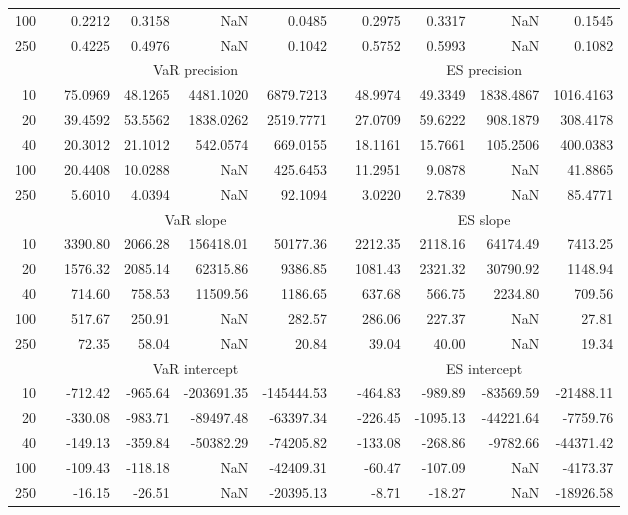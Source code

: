 {{\begin{longtable}{rr rrrr r rrrr}
100 && 0.2212  & 0.3158  &    NaN & 0.0485 && 0.2975  & 0.3317  &    NaN & 0.1545 \\ 
250 && 0.4225  & 0.4976  &    NaN & 0.1042 && 0.5752  & 0.5993  &    NaN & 0.1082 \\ 
\hline 
 & & \multicolumn{4}{c}{VaR precision} &&  \multicolumn{4}{c}{ES precision} \\ \cline{3-6}  \cline{8-11}
10 && 75.0969 & 48.1265 & 4481.1020 & 6879.7213 & & 48.9974 & 49.3349 & 1838.4867 & 1016.4163 \\ 
20 && 39.4592 & 53.5562 & 1838.0262 & 2519.7771 & & 27.0709 & 59.6222 & 908.1879 & 308.4178 \\ 
40 && 20.3012 & 21.1012 & 542.0574 & 669.0155 & & 18.1161 & 15.7661 & 105.2506 & 400.0383 \\ 
100 && 20.4408 & 10.0288 &    NaN & 425.6453 & & 11.2951 & 9.0878 &    NaN & 41.8865 \\ 
250 && 5.6010 & 4.0394 &    NaN & 92.1094 & & 3.0220 & 2.7839 &    NaN & 85.4771 \\ 
\hline 
 & & \multicolumn{4}{c}{ VaR slope} && \multicolumn{4}{c}{ES slope} \\ \cline{3-6}  \cline{8-11}
10 && 3390.80 & 2066.28 & 156418.01 & 50177.36 && 2212.35 & 2118.16 & 64174.49 & 7413.25 \\ 
20 && 1576.32 & 2085.14 & 62315.86 & 9386.85 && 1081.43 & 2321.32 & 30790.92 & 1148.94 \\ 
40 && 714.60 & 758.53 & 11509.56 & 1186.65 && 637.68 & 566.75 & 2234.80 & 709.56 \\ 
100 && 517.67 & 250.91 &  NaN & 282.57 && 286.06 & 227.37 &  NaN & 27.81 \\ 
250 && 72.35 & 58.04 &  NaN & 20.84 && 39.04 & 40.00 &  NaN & 19.34 \\ 
\hline 
 & & \multicolumn{4}{c}{ VaR intercept} &&  \multicolumn{4}{c}{ES intercept} \\ \cline{3-6}  \cline{8-11}
10 && -712.42 & -965.64 & -203691.35 & -145444.53 && -464.83 & -989.89 & -83569.59 & -21488.11 \\ 
20 && -330.08 & -983.71 & -89497.48 & -63397.34 && -226.45 & -1095.13 & -44221.64 & -7759.76 \\ 
40 && -149.13 & -359.84 & -50382.29 & -74205.82 && -133.08 & -268.86 & -9782.66 & -44371.42 \\ 
100 && -109.43 & -118.18 &  NaN & -42409.31 && -60.47 & -107.09 &  NaN & -4173.37 \\ 
250 && -16.15 & -26.51 &  NaN & -20395.13 && -8.71 & -18.27 &  NaN & -18926.58 \\ 

\end{longtable}}}
